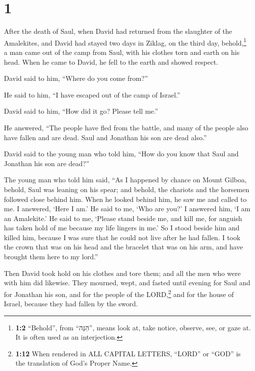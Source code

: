 \hypertarget{section}{%
\section{1}\label{section}}

 After the death of Saul, when David had returned from the
slaughter of the Amalekites, and David had stayed two days in Ziklag,
 on the third day, behold,\footnote{\textbf{1:2}
  ``Behold'', from ``הִנֵּה'', means look at, take notice, observe, see,
  or gaze at. It is often used as an interjection.} a man came out of
the camp from Saul, with his clothes torn and earth on his head. When he
came to David, he fell to the earth and showed respect.

 David said to him, ``Where do you come from?''

He said to him, ``I have escaped out of the camp of Israel.''

 David said to him, ``How did it go? Please tell me.''

He answered, ``The people have fled from the battle, and many of the
people also have fallen and are dead. Saul and Jonathan his son are dead
also.''

 David said to the young man who told him, ``How do you
know that Saul and Jonathan his son are dead?''

 The young man who told him said, ``As I happened by
chance on Mount Gilboa, behold, Saul was leaning on his spear; and
behold, the chariots and the horsemen followed close behind him.
 When he looked behind him, he saw me and called to me. I
answered, `Here I am.'  He said to me, `Who are you?' I
answered him, `I am an Amalekite.'  He said to me, `Please
stand beside me, and kill me, for anguish has taken hold of me because
my life lingers in me.'  So I stood beside him and killed
him, because I was sure that he could not live after he had fallen. I
took the crown that was on his head and the bracelet that was on his
arm, and have brought them here to my lord.''

 Then David took hold on his clothes and tore them; and
all the men who were with him did likewise.  They
mourned, wept, and fasted until evening for Saul and for Jonathan his
son, and for the people of the LORD,\footnote{\textbf{1:12} When
  rendered in ALL CAPITAL LETTERS, ``LORD'' or ``GOD'' is the
  translation of God's Proper Name.} and for the house of Israel,
because they had fallen by the sword.

